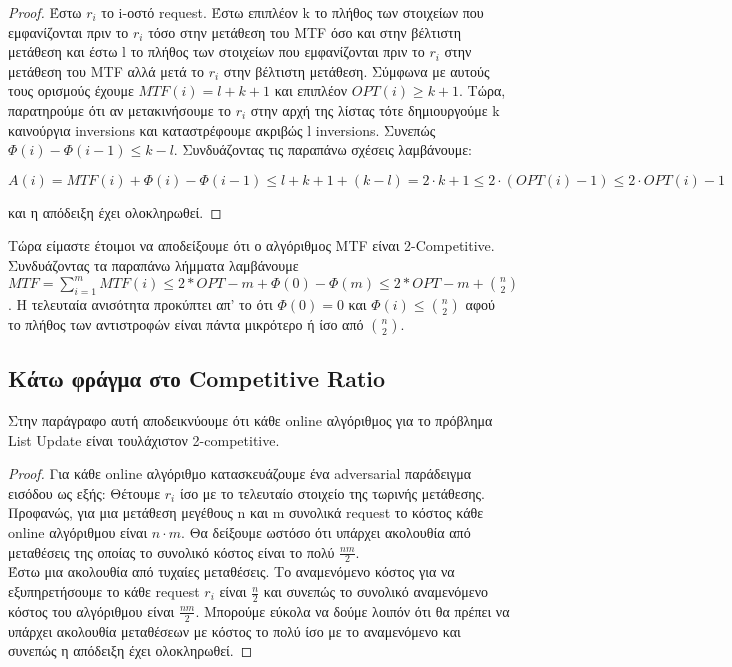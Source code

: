 \begin{proof}
    Έστω $r_i$ το i-οστό request. Έστω επιπλέον k το πλήθος των στοιχείων που εμφανίζονται πριν το  $r_i$ τόσο στην μετάθεση του MTF όσο και στην βέλτιστη μετάθεση και έστω l το πλήθος των στοιχείων που εμφανίζονται πριν το $r_i$ στην μετάθεση του MTF αλλά μετά το $r_i$ στην βέλτιστη μετάθεση. Σύμφωνα με αυτούς τους ορισμούς έχουμε $MTF(i) = l + k + 1$ και επιπλέον $OPT(i) \geq k + 1$. Τώρα, παρατηρούμε ότι αν μετακινήσουμε το $r_i$ στην αρχή της λίστας τότε δημιουργούμε k καινούργια inversions και καταστρέφουμε ακριβώς l inversions. Συνεπώς $\Phi(i) - \Phi(i-1) \leq k - l$. Συνδυάζοντας τις παραπάνω σχέσεις λαμβάνουμε:
    
    \begin{equation*}
        A(i) = MTF(i) + \Phi(i) - \Phi(i-1) \leq l + k + 1 + ( k - l ) = 2 \cdot k + 1 \leq 2 \cdot ( OPT(i) - 1 ) \leq 2 \cdot OPT(i) - 1
    \end{equation*}
    
    \noindent και η απόδειξη έχει ολοκληρωθεί.
\end{proof}

Τώρα είμαστε έτοιμοι να αποδείξουμε ότι ο αλγόριθμος MTF είναι 2-Competitive. Συνδυάζοντας τα παραπάνω λήμματα λαμβάνουμε $MTF = \sum_{i=1}^m MTF(i) \leq 2*OPT - m + \Phi(0) - \Phi(m) \leq 2*OPT - m + \binom{n}{2}$. Η τελευταία ανισότητα προκύπτει απ' το ότι $\Phi(0) = 0$ και $\Phi(i) \leq \binom{n}{2}$ αφού το πλήθος των αντιστροφών είναι πάντα μικρότερο ή ίσο από $\binom{n}{2}$.

\subsection{Κάτω φράγμα στο Competitive Ratio}

Στην παράγραφο αυτή αποδεικνύουμε ότι κάθε online αλγόριθμος για το πρόβλημα List Update είναι τουλάχιστον 2-competitive.

\begin{proof}
    Για κάθε online αλγόριθμο κατασκευάζουμε ένα adversarial παράδειγμα εισόδου ως εξής: Θέτουμε $r_i$ ίσο με το τελευταίο στοιχείο της τωρινής μετάθεσης. Προφανώς, για μια μετάθεση μεγέθους n και m συνολικά request το κόστος κάθε online αλγόριθμου είναι $n \cdot m$. Θα δείξουμε ωστόσο ότι υπάρχει ακολουθία από μεταθέσεις της οποίας το συνολικό κόστος είναι το πολύ $\frac{nm}{2}$. \\
    
    Έστω μια ακολουθία από τυχαίες μεταθέσεις. Το αναμενόμενο κόστος για να εξυπηρετήσουμε το κάθε request $r_i$ είναι $\frac{n}{2}$ και συνεπώς το συνολικό αναμενόμενο κόστος του αλγόριθμου είναι $\frac{nm}{2}$. Μπορούμε εύκολα να δούμε λοιπόν ότι θα πρέπει να υπάρχει ακολουθία μεταθέσεων με κόστος το πολύ ίσο με το αναμενόμενο και συνεπώς η απόδειξη έχει ολοκληρωθεί.
\end{proof}

